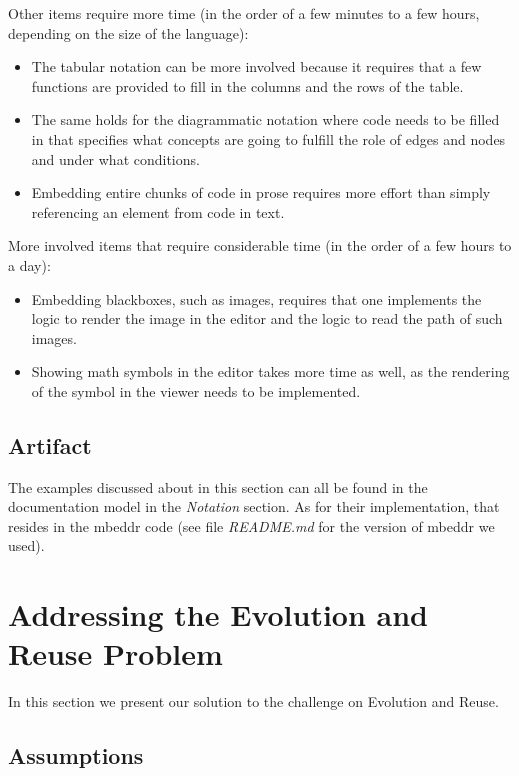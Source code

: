 \documentclass[preprint,numbers,10pt]{sigplanconf}
\begin{document}
Other items require more time (in the order of a few minutes to a few hours, depending on the size of the language):
\begin{itemize}
\item The tabular notation can be more involved because it requires that a few functions are provided
to fill in the columns and the rows of the table.
\item The same holds for the diagrammatic notation where code needs to be filled in that specifies what concepts
are going to fulfill the role of edges and nodes and under what conditions.
\item Embedding entire chunks of code in prose requires more effort than simply referencing an element from code in text.
\end{itemize}

More involved items that require considerable time (in the order of a few hours to a day):
\begin{itemize}
\item Embedding blackboxes, such as images, requires that one implements the logic to render the image in the
editor and the logic to read the path of such images.
\item Showing math symbols in the editor takes more time as well, as the rendering of the symbol in the viewer needs to be
implemented.
\end{itemize}

\subsection{Artifact}
The examples discussed about in this section can all be found in the documentation model in the \emph{Notation} section.
As for their implementation, that resides in the mbeddr code (see file \emph{README.md} for the version of mbeddr we used).

%
%

\section{Addressing the Evolution and Reuse Problem}

In this section we present our solution to the challenge on Evolution and Reuse.

\subsection{Assumptions}
\end{document}
